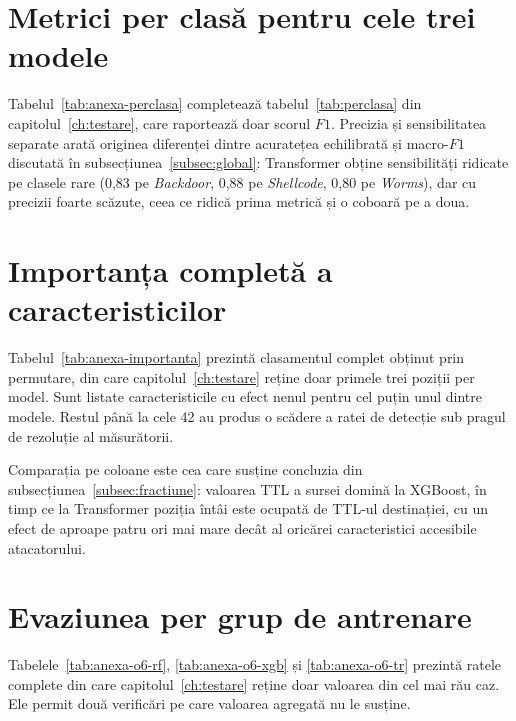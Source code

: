 

\section{Metrici per clasă pentru cele trei modele}\label{sec:anexa-perclasa}

Tabelul~\ref{tab:anexa-perclasa} completează tabelul~\ref{tab:perclasa} din capitolul~\ref{ch:testare}, care raportează doar scorul $F1$. Precizia și sensibilitatea separate arată originea diferenței dintre acuratețea echilibrată și macro-$F1$ discutată în subsecțiunea~\ref{subsec:global}: Transformer obține sensibilități ridicate pe clasele rare (0,83 pe \textit{Backdoor}, 0,88 pe \textit{Shellcode}, 0,80 pe \textit{Worms}), dar cu precizii foarte scăzute, ceea ce ridică prima metrică și o coboară pe a doua.



\section{Importanța completă a caracteristicilor}\label{sec:anexa-importanta}

Tabelul~\ref{tab:anexa-importanta} prezintă clasamentul complet obținut prin permutare, din care capitolul~\ref{ch:testare} reține doar primele trei poziții per model. Sunt listate caracteristicile cu efect nenul pentru cel puțin unul dintre modele. Restul până la cele 42 au produs o scădere a ratei de detecție sub pragul de rezoluție al măsurătorii.

Comparația pe coloane este cea care susține concluzia din subsecțiunea~\ref{subsec:fractiune}: valoarea TTL a sursei domină la XGBoost, în timp ce la Transformer poziția întâi este ocupată de TTL-ul destinației, cu un efect de aproape patru ori mai mare decât al oricărei caracteristici accesibile atacatorului.



\section{Evaziunea per grup de antrenare}\label{sec:anexa-o6}

Tabelele~\ref{tab:anexa-o6-rf}, \ref{tab:anexa-o6-xgb} și \ref{tab:anexa-o6-tr} prezintă ratele complete din care capitolul~\ref{ch:testare} reține doar valoarea din cel mai rău caz. Ele permit două verificări pe care valoarea agregată nu le susține.

